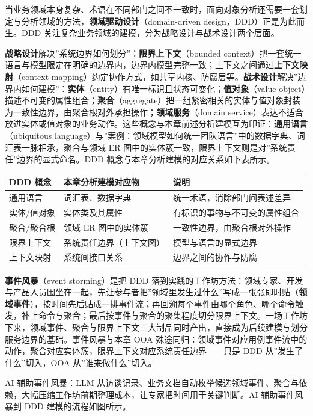 \documentclass[12pt,a4paper,twoside,openany]{ctexbook}
\numberwithin{figure}{chapter}
\numberwithin{table}{chapter}
\newcounter{none}
\begin{document}
当业务领域本身复杂、术语在不同部门之间不一致时，面向对象分析还需要一套划定与分析领域的方法，\textbf{领域驱动设计}（domain-driven
design，DDD）正是为此而生。DDD
关注复杂业务领域的建模，分为战略设计与战术设计两个层面。

\textbf{战略设计}解决''系统边界如何划分''：\textbf{限界上下文}（bounded
context）把一套统一语言与模型限定在明确的边界内，边界内模型完整一致；上下文之间通过\textbf{上下文映射}（context
mapping）约定协作方式，如共享内核、防腐层等。\textbf{战术设计}解决''边界内如何建模''：\textbf{实体}（entity）有唯一标识且状态可变化；\textbf{值对象}（value
object）描述不可变的属性组合；\textbf{聚合}（aggregate）把一组紧密相关的实体与值对象封装为一致性边界，由聚合根对外承担操作；\textbf{领域服务}（domain
service）表达不适合放进实体或值对象的业务动作。这些概念与本章前述分析建模互为印证：\textbf{通用语言}（ubiquitous
language）与''案例：领域模型如何统一团队语言''中的数据字典、词汇表一脉相承，聚合与领域
ER 图中的实体簇一致，限界上下文则是对''系统责任''边界的显式命名。DDD
概念与本章分析建模的对应关系如下表所示。

{\def\LTcaptype{none} %
\begin{longtable}[]{@{}lll@{}}
\toprule\noalign{}
DDD 概念 & 本章分析建模对应物 & 说明 \\
\midrule\noalign{}
\endhead
\bottomrule\noalign{}
\endlastfoot
通用语言 & 词汇表、数据字典 & 统一术语，消除部门间表述差异 \\
实体/值对象 & 实体类及其属性 & 有标识的事物与不可变的属性组合 \\
聚合/聚合根 & 领域 ER 图中的实体簇 & 一致性边界，由聚合根对外操作 \\
限界上下文 & 系统责任边界（上下文图） & 模型与语言的显式边界 \\
上下文映射 & 系统间接口关系 & 边界之间的协作与防腐 \\
\end{longtable}
}

\textbf{事件风暴}（event storming）是把 DDD
落到实践的工作坊方法：领域专家、开发与产品人员围坐在一起，先让参与者把''领域里发生过什么''写成一张张即时贴（\textbf{领域事件}），按时间先后贴成一排事件流；再回溯每个事件由哪个角色、哪个命令触发，补上命令与聚合；最后按事件与聚合的聚集程度切分限界上下文。一场工作坊下来，领域事件、聚合与限界上下文三大制品同时产出，直接成为后续建模与划分服务边界的基础。事件风暴与本章
OOA
殊途同归：领域事件对应用例事件流中的动作，聚合对应实体簇，限界上下文对应系统责任边界------只是
DDD 从''发生了什么''切入，OOA 从''谁来做什么''切入。

AI 辅助事件风暴：LLM
从访谈记录、业务文档自动枚举候选领域事件、聚合与依赖，大幅压缩工作坊前期整理成本，让专家把时间用于关键判断。AI
辅助事件风暴到 DDD 建模的流程如图所示。
\end{document}

